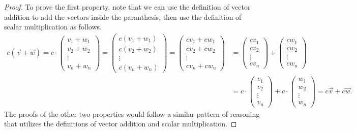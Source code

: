 \documentclass[11pt]{amsart} %
\theoremstyle{plain}
\theoremstyle{definition}
\theoremstyle{definition}
\theoremstyle{remark}
\theoremstyle{definition}
\begin{document}
\begin{tcolorbox}
\begin{proof}
      To prove the first property, note that we can use the definition of vector addition to add the vectors inside the paranthesis, then use the definition of scalar multiplication as follows.
      \begin{align*}
            c(\vec{v}+\vec{w}) = c\cdot \left( \begin{smallmatrix} v_1+w_1 \\ v_2+w_2 \\ \vdots \\ v_n+w_n \end{smallmatrix} \right)
            =\left( \begin{smallmatrix} c(v_1+w_1) \\ c(v_2+w_2) \\ \vdots \\ c(v_n+w_n) \end{smallmatrix} \right)
            =\left( \begin{smallmatrix} cv_1+cw_1 \\ cv_2+cw_2 \\ \vdots \\ cv_n+cw_n \end{smallmatrix} \right)
            &=\left( \begin{smallmatrix} cv_1 \\ cv_2 \\ \vdots \\ cv_n \end{smallmatrix} \right) + \left( \begin{smallmatrix} cw_1 \\ cw_2 \\ \vdots \\ cw_n \end{smallmatrix} \right) \\
            &=c\cdot \left( \begin{smallmatrix} v_1 \\ v_2 \\ \vdots \\ v_n \end{smallmatrix} \right) + c\cdot \left( \begin{smallmatrix} w_1 \\ w_2 \\ \vdots \\ w_n \end{smallmatrix} \right)
            =c\vec{v}+c\vec{w}.
      \end{align*}
      The proofs of the other two properties would follow a similar pattern of reasoning that utilizes the definitions of vector addition and scalar multiplication.
\end{proof}
\end{tcolorbox}
\bigskip \bigskip
\end{document}
